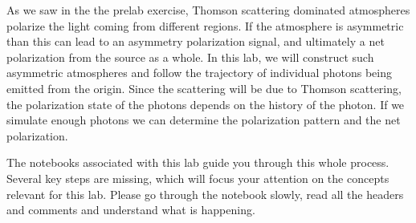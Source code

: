 \documentclass[12pt]{amsart}
\begin{document}
As we saw in the the prelab exercise, Thomson scattering
dominated atmospheres polarize the light coming from different
regions.  If the atmosphere is asymmetric than this can lead to an
asymmetry polarization signal, and ultimately a net polarization from
the source as a whole.  In this lab, we will construct such asymmetric
atmospheres and follow the trajectory of individual photons being
emitted from the origin.  Since the scattering will be due to Thomson
scattering, the polarization state of the photons depends on the
history of the photon.  If we simulate enough photons we can determine
the polarization pattern and the net polarization.

The notebooks associated with this lab guide you through this whole
process.  Several key steps are missing, which will focus your
attention on the concepts relevant for this lab.  Please go through
the notebook slowly, read all the headers and comments and understand
what is happening. 
\end{document}
